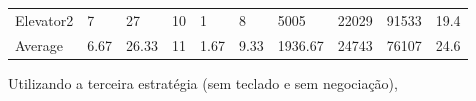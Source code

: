 \documentclass[a4paper]{article}
\begin{document}
\begin{table}[h]
\begin{tabular}{@{}llllllllll@{}}
Elevator2 & 7        & 27            & 10           & 1                                                               & 8                                                                  & 5005                                                         & 22029                                                 & 91533                                                   & 19.4         \\
Average   & 6.67     & 26.33         & 11        & 1.67                                                            & 9.33                                                               & 1936.67                                                         & 24743                                                 & 76107                                                   &  24.6         \\ \bottomrule
\end{tabular}
\end{table}

\newpage

Utilizando a terceira estratégia (sem teclado e sem negociação),
\end{document}
